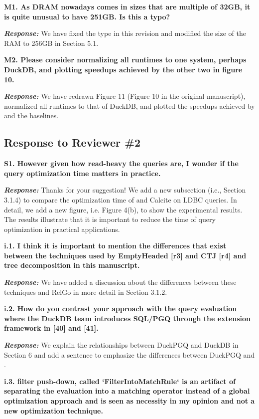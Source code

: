 \textbf{M1. As DRAM nowadays comes in sizes that are multiple of 32GB, it is quite unusual to have 251GB. Is this a typo?}

\textbf{\textit{Response: }}
We have fixed the type in this revision and modified the size of the RAM to 256GB in Section 5.1.

\textbf{M2. Please consider normalizing all runtimes to one system, perhaps DuckDB, and plotting speedups achieved by the other two in figure 10.}

\textbf{\textit{Response: }}
We have redrawn Figure 11 (Figure 10 in the original manuscript), normalized all runtimes to that of DuckDB, and plotted the speedups achieved by \name and the baselines.


\subsection{Response to Reviewer \#2}

\textbf{S1. However given how read-heavy the queries are, I wonder if the query optimization time matters in practice.}

\textbf{\textit{Response: }}
Thanks for your suggestion! We add a new subsection (i.e., Section 3.1.4) to compare the optimization time of \name and Calcite on LDBC queries.
In detail, we add a new figure, i.e. Figure 4(b), to show the experimental results.
The results illustrate that it is important to reduce the time of query optimization in practical applications.



\textbf{
i.1. I think it is important to mention the differences that exist between the techniques used by EmptyHeaded [r3] and CTJ [r4]  and tree decomposition in this manuscript.}

\textbf{\textit{Response: }}
We have added a discussion about the differences between these techniques and RelGo in more detail in Section 3.1.2.


\textbf{i.2. How do you contrast your approach with the query evaluation where the DuckDB team introduces SQL/PGQ through the extension framework in [40] and [41].}

\textbf{\textit{Response: }}
We explain the relationships between DuckPGQ and DuckDB in Section 6 and add a sentence to emphasize the differences between DuckPGQ and \name.


\textbf{i.3. filter push-down, called `FilterIntoMatchRule` is an artifact of separating the evaluation into a matching operator instead of a global optimization approach and is seen as necessity in my opinion and not a new optimization technique.}

